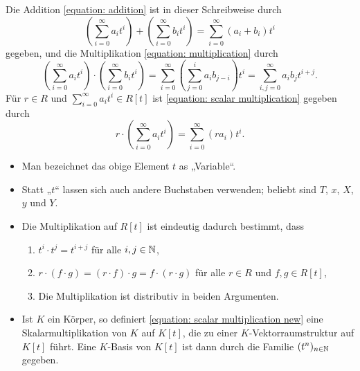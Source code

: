 Die Addition \eqref{equation: addition} ist in dieser Schreibweise durch
\begin{equation}
  \tag{A'}
    \left( \sum_{i=0}^\infty a_i t^i \right) + \left( \sum_{i=0}^\infty b_i t^i \right)
  = \sum_{i=0}^\infty (a_i + b_i) t^i
\end{equation}
gegeben, und die Multiplikation \eqref{equation: multiplication} durch
\begin{equation}
  \tag{M'}
    \left( \sum_{i=0}^\infty a_i t^i \right) \cdot \left( \sum_{i=0}^\infty b_i t^i \right)
  = \sum_{i=0}^\infty \left( \sum_{j=0}^i a_i b_{j-i} \right) t^i
  = \sum_{i,j=0}^\infty a_i b_j t^{i+j}.
\end{equation}
Für $r \in R$ und $\sum_{i=0}^\infty a_i t^i \in R[t]$ ist \eqref{equation: scalar multiplication} gegeben durch
\begin{equation}
  \tag{S'}
  \label{equation: scalar multiplication new}
    r \cdot \left( \sum_{i=0}^\infty a_i t^i \right)
  = \sum_{i=0}^\infty (r a_i) t^i.
\end{equation}


\begin{remark*}
  \begin{itemize}
    \item
      Man bezeichnet das obige Element $t$ as „Variable“.
    \item
      Statt „$t$“ lassen sich auch andere Buchstaben verwenden;
      beliebt sind $T$, $x$, $X$, $y$ und $Y$.
    \item
      Die Multiplikation auf $R[t]$ ist eindeutig dadurch bestimmt, dass
      \begin{enumerate}
        \item
          $t^i \cdot t^j = t^{i+j}$ für alle $i,j \in \mathbb{N}$,
        \item
          $r \cdot (f \cdot g) = (r \cdot f) \cdot g = f \cdot (r \cdot g)$ für alle $r \in R$ und $f,g \in R[t]$,
        \item
          Die Multiplikation ist distributiv in beiden Argumenten.
      \end{enumerate}
    \item
      Ist $K$ ein Körper, so definiert \eqref{equation: scalar multiplication new} eine Skalarmultiplikation von $K$ auf $K[t]$, die zu einer $K$-Vektorraumstruktur auf $K[t]$ führt.
      Eine $K$-Basis von $K[t]$ ist dann durch die Familie $(t^n)_{n \in \mathbb{N}}$ gegeben.
  \end{itemize}
\end{remark*}